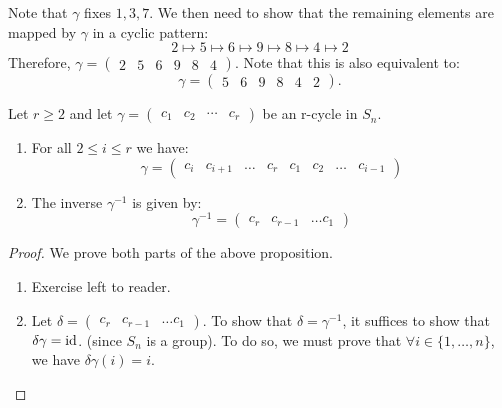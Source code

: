 \begin{itemize}
\begin{example}
        Note that $\gamma$ fixes $1,3,7$. We then need to show that the remaining elements are mapped by $\gamma$ in a cyclic pattern:
        \begin{equation}
            2\mapsto 5\mapsto 6\mapsto 9 \mapsto 8 \mapsto 4\mapsto 2
        \end{equation}
        Therefore, $\gamma=\begin{pmatrix}
            2&5&6&9&8&4
        \end{pmatrix}$. Note that this is also equivalent to:
        \begin{equation}
            \gamma=\begin{pmatrix}
                5&6&9&8&4&2
            \end{pmatrix}.
        \end{equation}
    \end{example}
        \begin{proposition}
            Let $r \ge 2$ and let $\gamma = \begin{pmatrix}
                c_1&c_2&\cdots & c_r
            \end{pmatrix}$ be an r-cycle in $S_n$.
            \begin{enumerate}
                \item For all $2\le i \le r$ we have:
                \begin{equation}
                    \gamma = \begin{pmatrix}
                        c_i & c_{i+1} & \dots & c_r & c_1 & c_2 & \dots & c_{i-1}
                    \end{pmatrix}
                \end{equation}
                \item The inverse $\gamma^{-1}$ is given by:
                \begin{equation}
                    \gamma^{-1} = \begin{pmatrix}
                        c_r & c_{r-1} & \dots c_1
                    \end{pmatrix}
                \end{equation}
            \end{enumerate}
        \end{proposition}
        \begin{proof} We prove both parts of the above proposition.
            \begin{enumerate}
                \item Exercise left to reader.
                \item Let $\delta = \begin{pmatrix}
                    c_r & c_{r-1} & \dots c_1
                \end{pmatrix}$. To show that $\delta = \gamma^{-1}$, it suffices to show that $\delta \gamma = \text{id}$. (since $S_n$ is a group). To do so, we must prove that $\forall i \in \{1,\dots,n\}$, we have $\delta\gamma(i)=i$.


\end{enumerate}
\end{proof}
\end{itemize}
